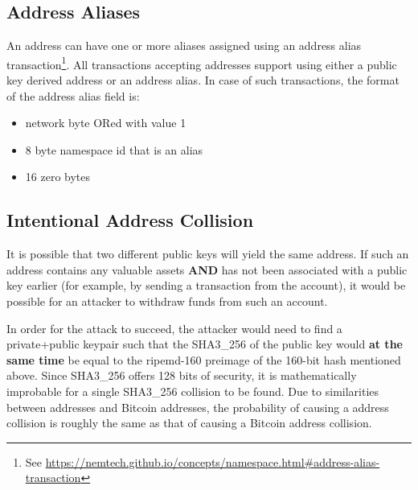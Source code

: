 \begin{figure}
\end{figure}

\pagebreak

\subsection{Address Aliases}
An address can have one or more aliases assigned using an address alias transaction\footnote{
See \url{https://nemtech.github.io/concepts/namespace.html\#address-alias-transaction}}.
All transactions accepting addresses support using either a public key derived address or an address alias.
In case of such transactions, the format of the address alias field is:
\begin{itemize}
	\item{network byte ORed with value 1}
	\item{8 byte namespace id that is an alias}
	\item{16 zero bytes}
\end{itemize}

\subsection{Intentional Address Collision}
It is possible that two different public keys will yield the same address.
If such an address contains any valuable assets \textbf{AND} has not been associated with a public key earlier (for example, by sending a transaction from the account), it would be possible for an attacker to withdraw funds from such an account.

In order for the attack to succeed, the attacker would need to find a private+public keypair such that the SHA3\_256 of the public key would \textbf{at the same time} be equal to the ripemd-160 preimage of the 160-bit hash mentioned above.
Since SHA3\_256 offers 128 bits of security, it is mathematically improbable for a single SHA3\_256 collision to be found.
Due to similarities between \codenamespace addresses and Bitcoin addresses, the probability of causing a \codenamespace address collision is roughly the same as that of causing a Bitcoin address collision.
